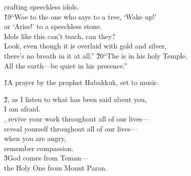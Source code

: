 \begin{poetry}
\poemll    crafting speechless idols. \\
\poeml \v{19}``Woe to the one who says to a tree, `Wake up!' \\
\poemll    or `Arise!' to a speechless stone. \\
\poeml Idols like this can't teach, can they? \\
\poemll    Look, even though it is overlaid with gold and silver, \\
\poemlll       there's no breath in it at all.''
\poeml \v{20}``The  is in his holy Temple. \\
\poemll    All the earth---be quiet in his presence.''
\end{poetry}

\v{1}A prayer by the prophet Habakkuk, set to music.

\begin{poetry}
\poeml \v{2}, as I listen to what has been said about you, \\
\poemll    I am afraid. \\
\poeml {}, revive your work throughout all of our lives--- \\
\poemll    reveal yourself throughout all of our lives--- \\
\poeml when you are angry, \\
\poemll    remember compassion. \\
\poeml \v{3}God comes from Teman--- \\
\poemll    the Holy One from Mount Paran.
\end{poetry}

